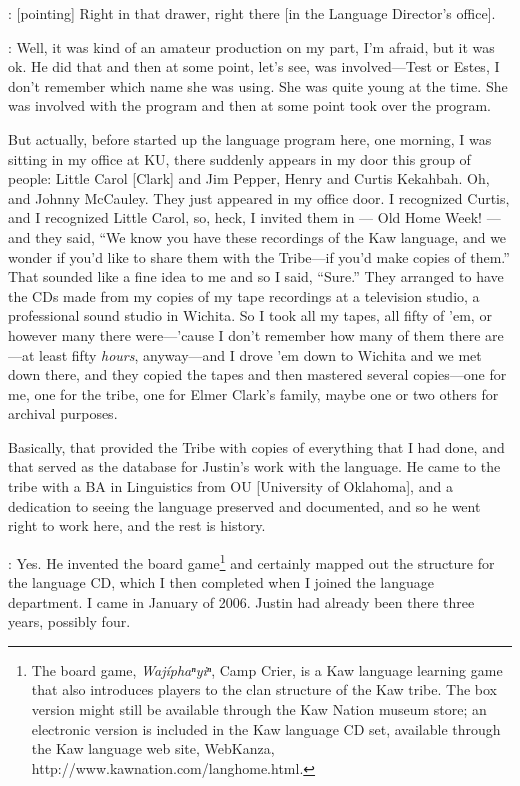 \documentclass[output=paper]{LSP/langsci}
\begin{document}
: [pointing] Right in that drawer, right there [in the Language Director's office].

: Well, it was kind of an amateur production on my part, I'm afraid, but it was ok. He did that and then at some point, let's see,  was involved---Test or Estes, I don't remember which name she was using. She was quite young at the time. She was involved with the program and then at some point  took over the program. 

But actually, before  started up the language program here, one morning, I was sitting in my office at KU, there suddenly appears in my door this group of people: Little Carol [Clark] and Jim Pepper, Henry and Curtis Kekahbah. Oh, and Johnny McCauley. They just appeared in my office door. I recognized Curtis, and I recognized Little Carol, so, heck, I invited them in --- Old Home Week! --- and they said, ``We know you have these recordings of the Kaw language, and we wonder if you'd like to share them with the Tribe---if you'd make copies of them.'' That sounded like a fine idea to me and so I said, ``Sure.'' They arranged to have the CDs made from my copies of my tape recordings at a television studio, a professional sound studio in Wichita. So I took all my tapes, all fifty of 'em, or however many there were---'cause I don't remember how many of them there are---at least fifty \textit{hours}, anyway---and I drove 'em down to Wichita and we met down there, and they copied the tapes and then mastered several copies---one for me, one for the tribe, one for Elmer Clark's family, maybe one or two others for archival purposes. 

Basically, that provided the Tribe with copies of everything that I had done, and that served as the database for Justin's work with the language. He came to the tribe with a BA in Linguistics from OU [University of Oklahoma], and a dedication to seeing the language preserved and documented, and so he went right to work here, and the rest is history.

: Yes. He invented the board game\footnote{The board game, \textit{Waj\'iphaⁿyiⁿ}, Camp Crier, is a Kaw language learning game that also introduces players to the clan structure of the Kaw tribe. The box version might still be available through the Kaw Nation museum store; an electronic version is included in the Kaw language CD set, available through the Kaw language web site, WebKanza, {http://www.kawnation.com/langhome.html}.} and certainly mapped out the structure for the language CD, which I then completed when I joined the language department. I came in January of 2006. Justin had already been there three years, possibly four.
\end{document}
